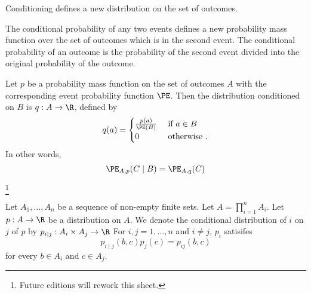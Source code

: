

Conditioning defines a new distribution on the set of outcomes.


The conditional probability
of any two events
defines a new probability
mass function over the
set of outcomes
which is in the second
event.
The conditional probability
of an outcome
is the probability of the
second event
divided into the original probability
of the outcome.


Let $p$ be a probability mass function on the set of outcomes $A$ with the corresponding event probability function $\PE$.
Then the distribution conditioned on $B$ is $q: A \to \R$, defined by
\[
  q(a) = \begin{cases}
    \frac{p(a)}{\PE(B)} & \text{ if } a \in B \\
    0 & \text{ otherwise }.
  \end{cases}
\]
In other words,
\[
   \PE_{A, p}(C \mid B) = \PE_{A,q}(C)
\]

\footnote{Future editions will rework this sheet.}

Let $A_1, \dots, A_n$ be a sequence of non-empty finite sets.
Let $A = \prod_{i = 1}^{n} A_i$.
Let $p: A \to \R$ be a distribution on $A$.
We denote the conditional distribution of $i$ on $j$ of $p$ by $p_{i \mid j}: A_i \times A_j \to \R$
For $i,j = 1, \dots, n$ and $i \neq j$, $p_i$ satisifes
\[
  p_{i \mid j}(b, c)p_{j}(c) = p_{ij}(b, c)
\]
for every $b \in A_i$ and $c \in A_j$.
